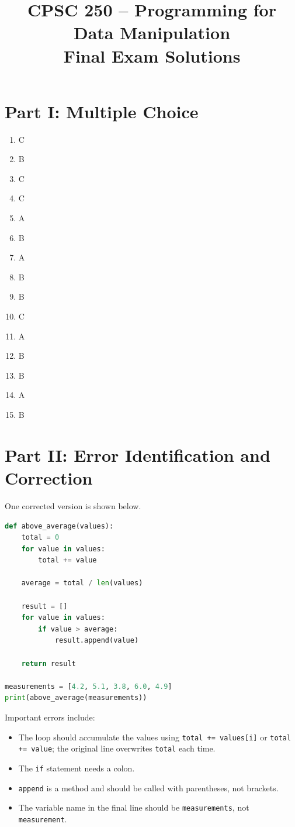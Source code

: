 \documentclass[12pt]{article}
\title{CPSC 250 -- Programming for Data Manipulation\\Final Exam Solutions}
\date{}
\begin{document}
\maketitle

\section*{Part I: Multiple Choice}

\begin{enumerate}[label=\arabic*.]
\item C
\item B
\item C
\item C
\item A
\item B
\item A
\item B
\item B
\item C
\item A
\item B
\item B
\item A
\item B
\end{enumerate}

\section*{Part II: Error Identification and Correction}

One corrected version is shown below.

\begin{lstlisting}[language=Python]
def above_average(values):
    total = 0
    for value in values:
        total += value

    average = total / len(values)

    result = []
    for value in values:
        if value > average:
            result.append(value)

    return result

measurements = [4.2, 5.1, 3.8, 6.0, 4.9]
print(above_average(measurements))
\end{lstlisting}

Important errors include:

\begin{itemize}
\item The loop should accumulate the values using \texttt{total += values[i]} or \texttt{total += value}; the original line overwrites \texttt{total} each time.
\item The \texttt{if} statement needs a colon.
\item \texttt{append} is a method and should be called with parentheses, not brackets.
\item The variable name in the final line should be \texttt{measurements}, not \texttt{measurement}.
\end{itemize}
\end{document}
